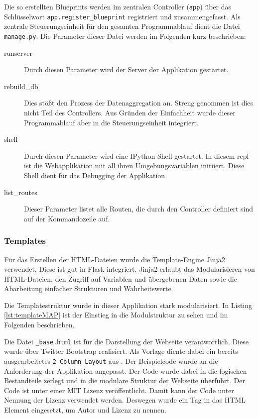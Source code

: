 Die so erstellten Blueprints werden im zentralen Controller (\texttt{app}) über das Schlüsselwort \texttt{app.register\_blueprint} registriert und zusammengefasst.
Als zentrale Steuerungseinheit für den gesamten Programmablauf dient die Datei \texttt{manage.py}. Die Parameter dieser Datei werden im Folgenden kurz beschrieben:

\begin{description}

 \item [runserver] Durch diesen Parameter wird der Server der Applikation gestartet.


 \item [rebuild\_db] Dies stößt den Prozess der Datenaggregation an.  Streng genommen ist dies nicht Teil des Controllers. Aus Gründen der Einfachheit wurde dieser Programmablauf aber in die Steuerungseinheit integriert.

 \item [shell] Durch diesen Parameter wird eine IPython-Shell gestartet. In diesem repl ist die Webapplikation mit all ihren Umgebungsvariablen initiiert. Diese Shell dient für das Debugging der Applikation.

 \item [list\_routes] Dieser Parameter listet alle Routen, die durch den Controller definiert sind auf der Kommandozeile auf.
\end{description}


\subsubsection{Templates}

Für das Erstellen der HTML-Dateien wurde die Template-Engine Jinja2 verwendet. Diese ist gut in Flask integriert. Jinja2 erlaubt das Modularisieren von HTML-Dateien, den Zugriff auf Variablen und übergebenen Daten sowie die Abarbeitung einfacher Strukturen und Wahrheitswerte.


Die Templatestruktur wurde in dieser Applikation stark modularisiert.  In Listing \ref{lst:templateMAP} ist der Einstieg in die Modulstruktur zu sehen und im Folgenden beschrieben.

Die Datei \texttt{\_base.html} ist für die Darstellung der Webseite verantwortlich. Diese wurde über Twitter Bootstrap realisiert. Als Vorlage diente dabei ein bereits ausgearbeitetes  \texttt{2-Column Layout} aus \cite{Ng2014}. Der Beispielcode wurde an die Anforderung der Applikation angepasst. Der Code wurde dabei in die logischen Bestandteile zerlegt und in die modulare Struktur der Webseite überführt. Der Code ist unter einer MIT Lizenz veröffentlicht. Damit kann der Code unter Nennung der Lizenz verwendet werden. Deswegen wurde ein Tag in das HTML Element eingesetzt, um Autor und Lizenz zu nennen.

